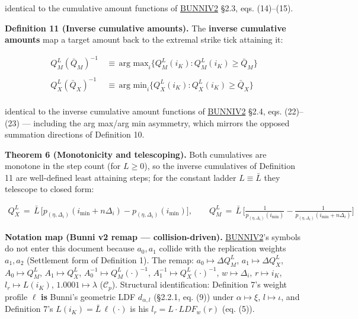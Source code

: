 \documentclass[11pt]{article}
\renewcommand{\_}{\textunderscore\allowbreak}
\begin{document}
identical to the cumulative amount functions of \href{../refs/bunni-v2.pdf}{BUNNI\_V2} §2.3, eqs. (14)--(15).

\textbf{Definition 11 (Inverse cumulative amounts).} The \textbf{inverse cumulative amounts} map a target amount back to the extremal strike tick attaining it:

\[
    \begin{aligned}
        Q_M^L (\bar Q_M)^{-1} \, &\equiv \, \text{arg max}_{i} \Big \{ Q_M^L (i_K): Q_M^L (i_K) \geq \bar Q_M\Big\}\\
        \\
            Q_X^L (\bar Q_X )^{-1} \, &\equiv \, \text{arg min}_{i} \Big \{ Q_X^L (i_K): Q_X^L (i_K) \geq \bar Q_X\Big\}\\
    \end{aligned}
\]

identical to the inverse cumulative amount functions of \href{../refs/bunni-v2.pdf}{BUNNI\_V2} §2.4, eqs. (22)--(23) --- including the arg max/arg min asymmetry, which mirrors the opposed summation directions of Definition 10.

\textbf{Theorem 6 (Monotonicity and telescoping).} Both cumulatives are monotone in the step count (for \(L \geq 0\)), so the inverse cumulatives of Definition 11 are well-defined least attaining steps; for the constant ladder \(L \equiv \bar L\) they telescope to closed form:

\[
    \begin{aligned}
        Q_X^L \, = \, \bar L\,\big[p_{(\eta, \Delta_i)}(i_{\min}+n\Delta_i) - p_{(\eta, \Delta_i)}(i_{\min})\big], \qquad
        Q_M^L \, = \, \bar L\,\Big[\frac{1}{p_{(\eta, \Delta_i)}(i_{\min})} - \frac{1}{p_{(\eta, \Delta_i)}(i_{\min}+n\Delta_i)}\Big]
    \end{aligned}
\]

\textbf{Notation map (Bunni v2 remap --- collision-driven).} \href{../refs/bunni-v2.pdf}{BUNNI\_V2}'s symbols do not enter this document because \(a_0, a_1\) collide with the replication weights \(a_1, a_2\) (Settlement form of Definition 1). The remap: \(a_0 \mapsto \Delta Q_M^L\), \(a_1 \mapsto \Delta Q_X^L\), \(A_0 \mapsto Q_M^L\), \(A_1 \mapsto Q_X^L\), \(A_0^{-1} \mapsto Q_M^L(\cdot)^{-1}\), \(A_1^{-1} \mapsto Q_X^L(\cdot)^{-1}\), \(w \mapsto \Delta_i\), \(r \mapsto i_K\), \(l_r \mapsto L(i_K)\), \(1.0001 \mapsto \lambda\) (\(\mathcal{C}_p\)). Structural identification: Definition 7's weight profile \(\ell\) \textbf{is} Bunni's geometric LDF \(d_{\alpha,l}\) (§2.2.1, eq. (9)) under \(\alpha \mapsto \xi\), \(l \mapsto \iota\), and Definition 7's \(L(i_K) = \bar L\,\ell(\cdot)\) is his \(l_r = L \cdot LDF_w(r)\) (eq. (5)).
\end{document}

